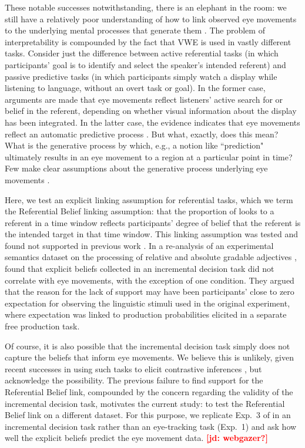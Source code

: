 \documentclass[10pt,letterpaper]{article}
\newcommand{\expref}[1]{Exp.~#1}
\newcommand{\jd}[1]{\textcolor{Red}{\textbf{[jd: #1]}}}
\begin{document}
These notable successes notwithstanding, there is an elephant in the room: we still have a relatively poor understanding of how to link observed eye movements to the underlying mental processes that generate them \cite{SalverdaTanenhaus2017:The-Visual-World-Paradigm, tanenhaus2000eye, Allopenna1998, magnuson2019fixations}. The problem of interpretability  is compounded by the fact that VWE is used in vastly different tasks. Consider just the difference between active referential tasks (in which participants' goal is to identify and select the speaker's intended referent) and passive predictive tasks (in which participants simply watch a display while listening to language, without an overt task or goal). In the former case, arguments are made that eye movements reflect listeners' active search for or belief in the referent, depending on whether visual information about the display has been integrated. In the latter case, the evidence indicates that eye movements reflect an automatic predictive process \cite{altmann1999}. But what, exactly, does this mean? What is the generative process by which, e.g., a notion like ``prediction" ultimately results in an eye movement to a region at a particular point in time? Few make clear assumptions about the generative process underlying eye movements \cite<but for a principled early example, see >{Allopenna1998}.

Here, we test an explicit linking assumption for referential tasks, which we term the Referential Belief linking assumption: that the proportion of looks to a referent in a time window reflects participants' degree of belief that the referent is the intended target in that time window. This linking assumption was tested and found not supported in previous work \cite{QingLD2018}. In a re-analysis of an experimental semantics dataset on the processing of relative and absolute gradable adjectives \cite{LeffelXiangKennedy2016:Imprecision-is-Pragmatic-},  found that explicit beliefs collected in an incremental decision task \cite<similar to gating tasks,>{Allopenna1998} did not correlate with eye movements, with the exception of one condition. They argued that the reason for the lack of support may have been participants' close to zero expectation  for observing the linguistic stimuli used in the original experiment, where expectation was linked to production probabilities elicited in a separate free production task.

Of course, it is also possible that the incremental decision task simply does not capture the beliefs that inform eye movements. We believe this is unlikely, given recent successes in using such tasks to elicit contrastive inferences \cite{KreissDegen2020, alsop2018}, but acknowledge the possibility. The previous failure to find support for the Referential Belief link, compounded by the concern regarding the validity of the incremental decision task, motivates the current study: to test the Referential Belief link on a different dataset. For this purpose, we replicate \expref{3} of  in an incremental decision task rather than an eye-tracking task (\expref{1}) and ask how well the explicit beliefs predict the eye movement data. \jd{webgazer?}
\end{document}
